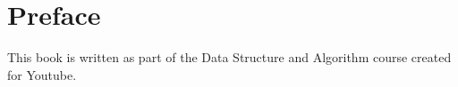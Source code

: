 \chapter*{Preface} 
{}
This book is written as part of the Data Structure and Algorithm course created for Youtube.